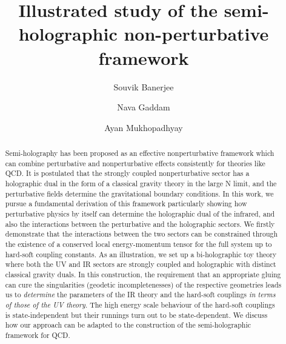 \documentclass[prd,reprint,a4paper,showpacs,superscriptaddress,11pt,onecolumn,nofootinbib]{revtex4-1}
\renewcommand{\(}{\left(}
\renewcommand{\)}{\right)}
\newcommand{\6}{\partial}
\begin{document}
\title{Illustrated study of the semi-holographic non-perturbative framework}



\author{Souvik Banerjee}
\author{Nava Gaddam}
\author{Ayan Mukhopadhyay}



\begin{abstract}
Semi-holography has been proposed as an effective nonperturbative framework which can combine perturbative and nonperturbative effects consistently for theories like QCD. It is postulated that the strongly coupled nonperturbative sector has a holographic dual in the form of a classical gravity theory in the large N limit, and the perturbative fields determine the gravitational boundary conditions. In this work, we pursue a fundamental derivation of this framework particularly showing how perturbative physics by itself can determine the holographic dual of the infrared, and also the interactions between the perturbative and the holographic sectors. We firstly demonstrate that the interactions between the two sectors can be constrained through the existence of a conserved local energy-momentum tensor for the full system up to hard-soft coupling constants. As an illustration, we set up a bi-holographic toy theory where both the UV and IR sectors are strongly coupled and holographic with distinct classical gravity duals. In this construction, the requirement that an appropriate gluing can cure the singularities (geodetic incompletenesses) of the respective geometries leads us to \textit{determine} the parameters of the IR theory and the hard-soft couplings \textit{in terms of those of the UV theory}. The high energy scale behaviour of the hard-soft couplings is state-independent but their runnings turn out to be state-dependent. We discuss how our approach can be adapted to the construction of the semi-holographic framework for QCD.
\end{abstract}
\end{document}
